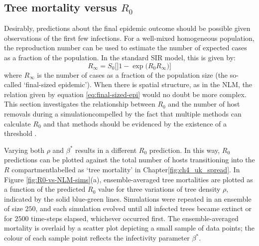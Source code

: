 \subsection{Tree mortality versus $R_0$}
\label{sec:tree-mortality-analytic}

Desirably, predictions about the final epidemic outcome should be possible given observations of the first few infections. 
For a well-mixed homogeneous population, the reproduction number can be used to estimate the number of expected cases as a fraction of the population.
In the standard SIR model, this is given by:
\begin{equation}
\label{eq:final-sized-epi}
    R_{\infty} = S_0\Big[]1 - \exp\big( R_0 R_\infty\big) \Big]
\end{equation}
where $R_\infty$ is the number of cases as a fraction of the population size (the so-called `final-sized epidemic'). 
When there is spatial structure, as in the NLM, the relation given by equation \ref{eq:final-sized-epi} would no doubt be more complex.
This section investigates the relationship between $R_0$ and the number of host removals during a simulation\textemdash compelled by the fact that multiple methods can calculate $R_0$ and that methods should be evidenced by the existence of a threshold \cite{li2011failure}.

Varying both $\rho$ and $\beta^*$ results in a different $R_0$ prediction.
In this way, $R_0$ predictions can be plotted against the total number of hosts transitioning into the $R$ compartment\textemdash labelled as `tree mortality' in Chapter\ref{fig:ch4_uk_spread}.
In Figure \ref{fig:R0-vs-NLM-sims}(a), ensemble-averaged tree mortalities are plotted as a function of the predicted $R_0$ value for three variations of tree density $\rho$, indicated by the solid blue-green lines.
Simulations were repeated in an ensemble of size $250$, and each simulation evolved until all infected trees became extinct or for $2500$ time-steps elapsed, whichever occurred first.
The ensemble-averaged mortality is overlaid by a scatter plot depicting a small sample of data points; the colour of each sample point reflects the infectivity parameter $\beta^*$.

